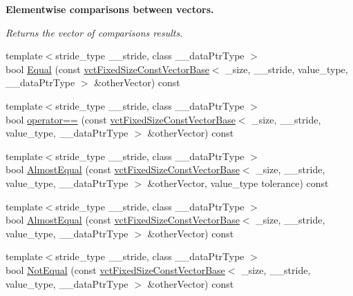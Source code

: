 \begin{Indent}{\bf Elementwise comparisons between vectors.}\par
{\em Returns the vector of comparison\textquotesingle{}s results. }\begin{DoxyCompactItemize}
\item 
{\footnotesize template$<$stride\+\_\+type \+\_\+\+\_\+stride, class \+\_\+\+\_\+data\+Ptr\+Type $>$ }\\bool \hyperlink{classvct_fixed_size_const_vector_base_aa38d2e3dbaa035b37c246dc53ae9bb70}{Equal} (const \hyperlink{classvct_fixed_size_const_vector_base}{vct\+Fixed\+Size\+Const\+Vector\+Base}$<$ \+\_\+size, \+\_\+\+\_\+stride, value\+\_\+type, \+\_\+\+\_\+data\+Ptr\+Type $>$ \&other\+Vector) const 
\item 
{\footnotesize template$<$stride\+\_\+type \+\_\+\+\_\+stride, class \+\_\+\+\_\+data\+Ptr\+Type $>$ }\\bool \hyperlink{classvct_fixed_size_const_vector_base_aca59301cbeb1a7d4c4de2bc0b71ca335}{operator==} (const \hyperlink{classvct_fixed_size_const_vector_base}{vct\+Fixed\+Size\+Const\+Vector\+Base}$<$ \+\_\+size, \+\_\+\+\_\+stride, value\+\_\+type, \+\_\+\+\_\+data\+Ptr\+Type $>$ \&other\+Vector) const 
\item 
{\footnotesize template$<$stride\+\_\+type \+\_\+\+\_\+stride, class \+\_\+\+\_\+data\+Ptr\+Type $>$ }\\bool \hyperlink{classvct_fixed_size_const_vector_base_a0f25ef63a9fd997f96335a895299cba2}{Almost\+Equal} (const \hyperlink{classvct_fixed_size_const_vector_base}{vct\+Fixed\+Size\+Const\+Vector\+Base}$<$ \+\_\+size, \+\_\+\+\_\+stride, value\+\_\+type, \+\_\+\+\_\+data\+Ptr\+Type $>$ \&other\+Vector, value\+\_\+type tolerance) const 
\item 
{\footnotesize template$<$stride\+\_\+type \+\_\+\+\_\+stride, class \+\_\+\+\_\+data\+Ptr\+Type $>$ }\\bool \hyperlink{classvct_fixed_size_const_vector_base_a227427cc3efc30b79cbefac7196e21e3}{Almost\+Equal} (const \hyperlink{classvct_fixed_size_const_vector_base}{vct\+Fixed\+Size\+Const\+Vector\+Base}$<$ \+\_\+size, \+\_\+\+\_\+stride, value\+\_\+type, \+\_\+\+\_\+data\+Ptr\+Type $>$ \&other\+Vector) const 
\item 
{\footnotesize template$<$stride\+\_\+type \+\_\+\+\_\+stride, class \+\_\+\+\_\+data\+Ptr\+Type $>$ }\\bool \hyperlink{classvct_fixed_size_const_vector_base_ac918c482412a22251943dc80dc085a9a}{Not\+Equal} (const \hyperlink{classvct_fixed_size_const_vector_base}{vct\+Fixed\+Size\+Const\+Vector\+Base}$<$ \+\_\+size, \+\_\+\+\_\+stride, value\+\_\+type, \+\_\+\+\_\+data\+Ptr\+Type $>$ \&other\+Vector) const 

\end{DoxyCompactItemize}
\end{Indent}
